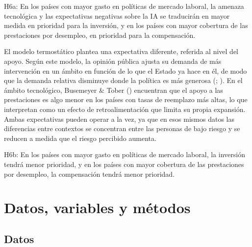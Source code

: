 \documentclass[
  spanish,
  12pt,
]{article}
\begin{document}
\begin{tcolorbox}[enhanced jigsaw, arc=.35mm, bottomrule=.15mm, breakable, colback=white, colframe=quarto-callout-note-color-frame, left=2mm, leftrule=.75mm, opacityback=0, rightrule=.15mm, toprule=.15mm]

H6a: En los países con mayor gasto en políticas de mercado laboral, la
amenaza tecnológica y las expectativas negativas sobre la IA se
traducirán en mayor medida en prioridad para la inversión, y en los
países con mayor cobertura de las prestaciones por desempleo, en
prioridad para la compensación.

\end{tcolorbox}

El modelo termostático plantea una expectativa diferente, referida al
nivel del apoyo. Según este modelo, la opinión pública ajusta su demanda
de más intervención en un ámbito en función de lo que el Estado ya hace
en él, de modo que la demanda relativa disminuye donde la política es
más generosa (; ). En el ámbito
tecnológico, Busemeyer \& Tober
() encuentran que el apoyo a
las prestaciones es algo menor en los países con tasas de reemplazo más
altas, lo que interpretan como un efecto de retroalimentación que limita
su propia expansión. Ambas expectativas pueden operar a la vez, ya que
en esos mismos datos las diferencias entre contextos se concentran entre
las personas de bajo riesgo y se reducen a medida que el riesgo
percibido aumenta.

\begin{tcolorbox}[enhanced jigsaw, arc=.35mm, bottomrule=.15mm, breakable, colback=white, colframe=quarto-callout-note-color-frame, left=2mm, leftrule=.75mm, opacityback=0, rightrule=.15mm, toprule=.15mm]

H6b: En los países con mayor gasto en políticas de mercado laboral, la
inversión tendrá menor prioridad, y en los países con mayor cobertura de
las prestaciones por desempleo, la compensación tendrá menor prioridad.

\end{tcolorbox}

\section{Datos, variables y métodos}\label{datos-variables-y-muxe9todos}

\subsection{Datos}\label{datos}
\end{document}

